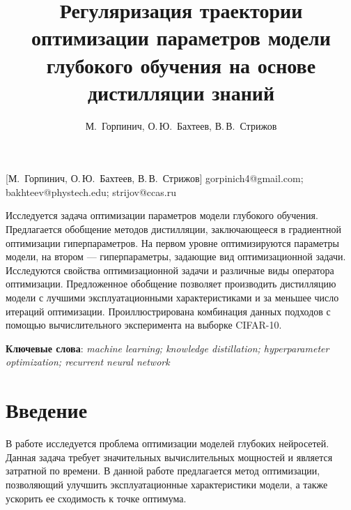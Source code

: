 \documentclass[12pt, twoside]{article}
\begin{document}
\title
    [Оптимизация параметров модели на основе дистилляции знаний] %
    {Регуляризация траектории оптимизации параметров модели глубокого обучения на основе дистилляции знаний}
\author
    [М.~Горпинич] %
    {М.~Горпинич, О.\,Ю.~Бахтеев, В.\,В.~Стрижов} %
    [М.~Горпинич, О.\,Ю.~Бахтеев, В.\,В.~Стрижов] %
\email
    {gorpinich4@gmail.com; bakhteev@phystech.edu;  strijov@ccas.ru}
\abstract
    {Исследуется задача оптимизации параметров модели глубокого обучения. Предлагается обобщение методов дистилляции, заключающееся в градиентной оптимизации гиперпараметров. На первом уровне оптимизируются параметры модели, на втором --- гиперпараметры, задающие вид оптимизационной задачи. Исследуются свойства оптимизационной задачи и различные виды оператора оптимизации. Предложенное обобщение позволяет производить дистилляцию модели с лучшими эксплуатационными характеристиками и за меньшее число итераций оптимизации. Проиллюстрирована комбинация данных подходов с помощью вычислительного эксперимента на выборке CIFAR-10.
	
\bigskip
\noindent
\textbf{Ключевые слова}: \emph {machine learning; knowledge distillation; hyperparameter optimization; recurrent neural network}
}

\doi{}
\receivedRus{}
\receivedEng{}

\maketitle
\linenumbers

\section{Введение}
В работе исследуется проблема оптимизации моделей глубоких нейросетей. Данная задача требует значительных вычислительных мощностей и является затратной по времени. В данной работе предлагается метод оптимизации, позволяющий улучшить эксплуатационные характеристики модели, а также ускорить ее сходимость к точке оптимума.
\end{document}
